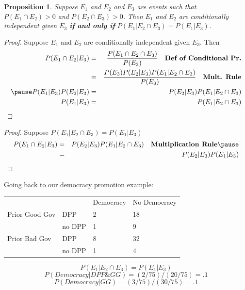 \documentclass[handout]{beamer}
\newtheorem{prop}{Proposition}
\numberwithin{equation}{section}
\begin{document}
\begin{frame}

\begin{prop}
Suppose $E_{1}$ and $E_{2}$ and $E_{3}$ are events such that $P(E_{1} \cap E_{2})>0$ and $P(E_{2} \cap E_{3}) >0$.  Then $E_{1}$ and $E_{2}$ are conditionally independent given $E_{3} $ \textbf{if and only if} $P(E_{1} | E_{2} \cap E_{3})  = P(E_{1} | E_{3}) $.  
\end{prop} \pause

\begin{proof}
Suppose $E_{1}$ and $E_{2}$ are conditionally independent given $E_{3}$.  Then 
\begin{eqnarray}
P(E_{1} \cap E_{2} |  E_{3}) & = & \frac{P(E_{1} \cap E_{2} \cap E_{3}  ) }{P(E_{3} )}  \quad \textbf{Def of Conditional Pr.}\nonumber \\
& = & \frac{P(E_{3})P(E_{2} | E_{3} )P(E_{1} | E_{2} \cap E_{3} ) }{ P(E_{3} )}  \quad \textbf{Mult. Rule} \nonumber \\\pause
P(E_{1}|E_{3}) P(E_{2} | E_{3} ) & = & P(E_{2} | E_{3} )P(E_{1} | E_{2} \cap E_{3} ) \nonumber \\
P(E_{1}|E_{3}) & = & P(E_{1} | E_{2} \cap E_{3} ) \nonumber 
\end{eqnarray}

\end{proof}





\end{frame}

\begin{frame}

\begin{proof}
Suppose $P(E_{1} | E_{2} \cap E_{3})  = P(E_{1} | E_{3}) $
\pause
\begin{eqnarray}
P(E_{1} \cap E_{2}| E_{3 } ) & = & P(E_{2} | E_{3} ) P(E_{1} | E_{2}\cap E_{3} ) \quad \textbf{Multiplication Rule}\nonumber \pause\\
 & = & P(E_{2} | E_{3} ) P(E_{1} | E_{3} ) \nonumber 
\end{eqnarray}

\end{proof}

\end{frame}




\begin{frame}
Going back to our democracy promotion example:
\begin{table}
\begin{tabular}{llll}
		&&Democracy& No Democracy\\
 Prior Good Gov & DPP &2 & 18\\
		 &no DPP & 1& 9\\
		 \hline
Prior Bad Gov  & DPP &8 & 32\\
		&no DPP & 1& 4\\
\end{tabular}
\end{table}\pause

$$P(E_{1} | E_{2} \cap E_{3})  = P(E_{1} | E_{3}) $$ 
$$P(Democracy| DPP\& GG) = (2/75)/(20/75)=.1$$
$$P(Democracy| GG) = (3/75)/(30/75)=.1$$

\end{frame}
\end{document}
